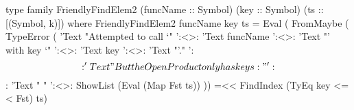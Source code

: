 \begin{code}
type family FriendlyFindElem2 (funcName :: Symbol)
                             (key :: Symbol)
                             (ts :: [(Symbol, k)]) where
  FriendlyFindElem2 funcName key ts =
    Eval (
      FromMaybe
           ( TypeError
           ( 'Text "Attempted to call `"
       ':<>: 'Text funcName
       ':<>: 'Text "' with key `"
       ':<>: 'Text key
       ':<>: 'Text "'."
       ':$$: 'Text "But the OpenProduct only has keys :"
       ':$$: 'Text "  "
       ':<>: ShowList (Eval (Map Fst ts))
           )) =<< FindIndex (TyEq key <=< Fst) ts)
\end{code}

